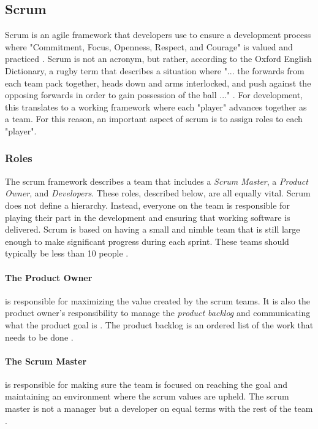 \subsection{Scrum}\label{sub:scrum}
Scrum is an agile framework that developers use to ensure a development process where "Commitment, Focus, Openness, Respect, and Courage" is valued and practiced \cite{schwaber_sutherland_2022}. Scrum is not an acronym, but rather, according to the Oxford English Dictionary, a rugby term that describes a situation where "... the forwards from each team pack together, heads down and arms interlocked, and push against the opposing forwards in order to gain possession of the ball ..." \cite{oedscrum}.
For development, this translates to a working framework where each "player" advances together as a team. 
For this reason, an important aspect of scrum is to assign roles to each "player".

\subsubsection{Roles}
The scrum framework describes a team that includes a \emph{Scrum Master}, a \emph{Product Owner}, and \emph{Developers}. 
These roles, described below, are all equally vital. 
Scrum does not define a hierarchy. 
Instead, everyone on the team is responsible for playing their part in the development and ensuring that working software is delivered. 
Scrum is based on having a small and nimble team that is still large enough to make significant progress during each sprint. 
These teams should typically be less than 10 people \cite{schwaber_sutherland_2022}.

\paragraph{The Product Owner}
is responsible for maximizing the value created by the scrum teams. 
It is also the product owner's responsibility to manage the \emph{product backlog} and communicating what the product goal is \cite{schwaber_sutherland_2022}. 
The product backlog is an ordered list of the work that needs to be done \cite{schwaber_sutherland_2022}.

\paragraph{The Scrum Master}
is responsible for making sure the team is focused on reaching the goal and maintaining an environment where the scrum values are upheld. 
The scrum master is not a manager but a developer on equal terms with the rest of the team \cite{schwaber_sutherland_2022}.


